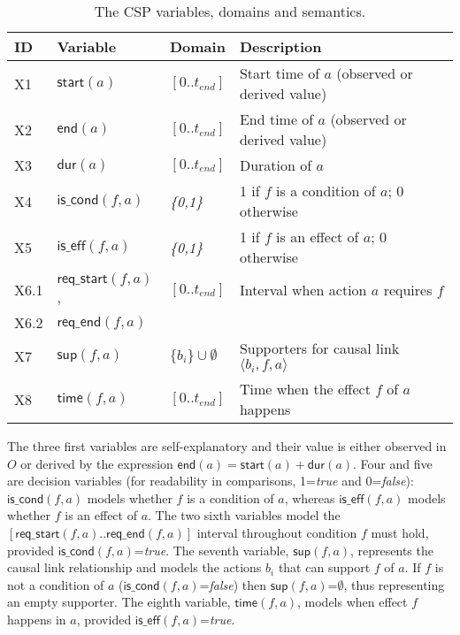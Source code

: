 \documentclass{ecai}
\newcommand{\tup}[1]{{\langle #1 \rangle}}
\newcommand{\dur}{\mathsf{dur}}    %
\newcommand{\iscond}{\mathsf{is\_cond}}    %
\newcommand{\iseff}{\mathsf{is\_eff}}    %
\newcommand{\start}{\mathsf{start}}%
\newcommand{\en}{\mathsf{end}}     %
\newcommand{\supp}{\mathsf{sup}}   %
\newcommand{\tim}{\mathsf{time}}   %
\newcommand{\reqs}{\mathsf{req\_{start}}} %
\newcommand{\reqe}{\mathsf{req\_{end}}}   %
\begin{document}
\begin{table}
\begin{center}
\caption{The CSP variables, domains and semantics.}
\begin{scriptsize}
\begin{tabular}{lllp{4.4cm}}
\hline	
{\bf ID} & {\bf Variable} & {\bf Domain} & {\bf Description} \\
\hline
X1 &$\start(a)$ & $[0..t_{end}]$ & Start time of $a$ (observed or derived value) \\
X2 &$\en(a)$ & $[0..t_{end}]$ & End time of $a$ (observed or derived value) \\
X3 &$\dur(a)$ & $[0..t_{end}]$ & Duration of $a$ \\

X4 &$\iscond(f,a)$ & \textit{\{0,1\}} & 1 if $f$ is a condition of $a$; 0 otherwise \\
X5 &$\iseff(f,a)$ & \textit{\{0,1\}} & 1 if $f$ is an effect of $a$; 0 otherwise \\

X6.1 &$\reqs(f,a)$, & $[0..t_{end}]$ & Interval when action $a$ requires $f$\\ 
X6.2 &$\reqe(f,a)$  &  & \\

X7 &$\supp(f,a)$ & $\{b_i\} \cup \emptyset $&  Supporters for causal link $\tup{b_i,f,a}$ \\ %
X8 &$\tim(f,a)$ & $[0..t_{end}]$ & Time when the effect $f$ of $a$ happens\\

\end{tabular}
\end{scriptsize}
\label{table:variables}
\end{center}
\end{table}

The three first variables are self-explanatory and their value is either observed in $O$ or derived by the expression $\en(a)=\start(a)+\dur(a)$.
Four and five are decision variables (for readability in comparisons, 1=\textit{true} and 0=\textit{false}): $\iscond(f,a)$ models whether $f$ is a condition of $a$, whereas $\iseff(f,a)$ models whether $f$ is an effect of $a$. The two sixth variables model the $[\reqs(f,a)..\reqe(f,a)]$ interval throughout condition $f$ must hold, provided $\iscond(f,a)$=\textit{true}.
The seventh variable, $\supp(f,a)$, represents the causal link relationship and models the actions $b_i$ that can support $f$ of $a$. If $f$ is not a condition of $a$ ($\iscond(f,a)$=\textit{false}) then $\supp(f,a)$=$\emptyset$, thus representing an empty supporter.
The eighth variable, $\tim(f,a)$, models when effect $f$ happens in $a$, provided $\iseff(f,a)$=\textit{true}.
\end{document}
